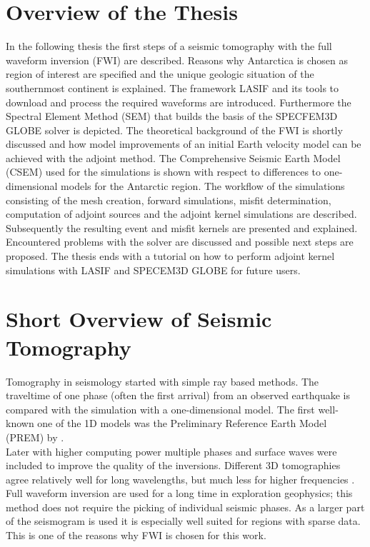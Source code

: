 \section{Overview of the Thesis}
In the following thesis the first steps of a seismic tomography with the full waveform inversion
(FWI) 
are described.
Reasons why Antarctica is chosen as region of interest are specified and the unique geologic 
situation of the southernmost continent is explained.
The framework LASIF and its tools to download and process the required 
waveforms are introduced.
Furthermore the Spectral Element Method (SEM) that builds the basis of the SPECFEM3D GLOBE 
solver is depicted.
The theoretical background of the FWI is shortly discussed and how model improvements 
of an initial Earth velocity model can be achieved with the adjoint method.
The Comprehensive Seismic Earth Model (CSEM) \citep{Afanasiev2015} used for the simulations is shown with
respect to differences to one-dimensional models for the Antarctic region.
The workflow of the simulations consisting of the mesh creation, forward simulations, 
misfit determination, computation of adjoint sources and the adjoint kernel simulations
are described.\\
Subsequently the resulting event and misfit kernels are presented and explained.
Encountered problems with the solver are discussed and possible next steps are proposed.
The thesis ends with a tutorial on how to perform adjoint kernel simulations
with LASIF and SPECEM3D GLOBE for future users.


\section{Short Overview of Seismic Tomography}

Tomography in seismology started with simple ray based methods.
The traveltime of one phase (often the first arrival) from an observed earthquake
is compared with the simulation with a one-dimensional model.
The first well-known one of the 1D models was the Preliminary Reference Earth Model
(PREM) by \citealp{dziewonski1981preliminary}.\\
%
Later with higher computing power multiple phases and surface waves were included
to improve the quality of the inversions.
Different 3D tomographies agree relatively well for long wavelengths, but much less
for higher frequencies \citep{Liu2012}. \\
%
Full waveform inversion are used for a long time in exploration geophysics;
this method does not require the picking of individual seismic phases.
As a larger part of the seismogram is used it is especially well suited
for regions with sparse data.
This is one of the reasons why FWI is chosen for this work.

